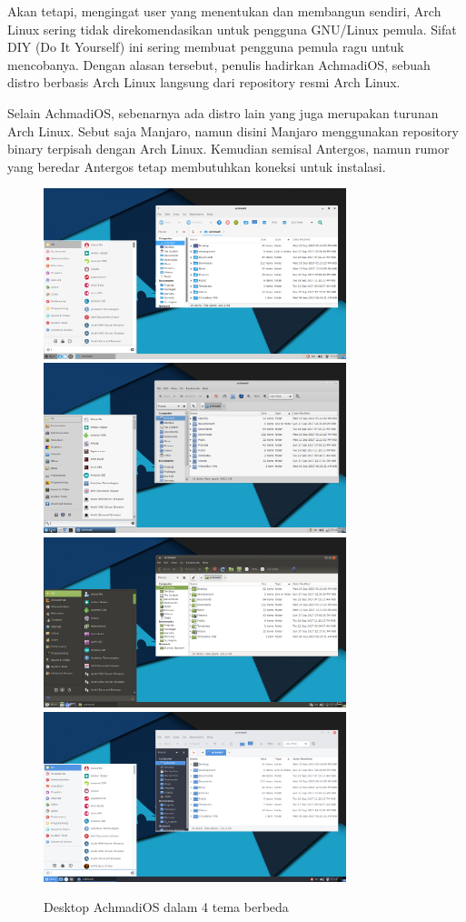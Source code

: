 \documentclass[12pt,]{article}
\begin{document}
	Akan tetapi, mengingat user yang menentukan dan membangun sendiri, Arch Linux sering tidak direkomendasikan untuk pengguna GNU/Linux pemula.
	Sifat DIY (Do It Yourself) ini sering membuat pengguna pemula ragu untuk mencobanya.
	Dengan alasan tersebut, penulis hadirkan AchmadiOS, sebuah distro berbasis Arch Linux langsung dari repository resmi Arch Linux.

	Selain AchmadiOS, sebenarnya ada distro lain yang juga merupakan turunan Arch Linux.
	Sebut saja Manjaro, namun disini Manjaro menggunakan repository binary terpisah dengan Arch Linux.
	Kemudian semisal Antergos, namun rumor yang beredar Antergos tetap membutuhkan koneksi untuk instalasi.
	
	\begin{figure}[!ht]
		\centering
		\includegraphics[width=250pt]{png/tema_1}
		\includegraphics[width=250pt]{png/tema_2}
		\includegraphics[width=250pt]{png/tema_3}
		\includegraphics[width=250pt]{png/tema_4}
		\caption{Desktop AchmadiOS dalam 4 tema berbeda}
	\end{figure}
\end{document}
